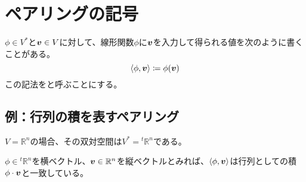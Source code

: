 \documentclass[../../../topic_linear-algebra]{subfiles}
\begin{document}
\sectionline
\section{ペアリングの記号}

$\phi \in V^*$と$\vb*{v} \in V$に対して、線形関数$\phi$に$\vb*{v}$を入力して得られる値を次のように書くことがある。
\begin{equation*}
  \langle \phi, \vb*{v} \rangle \coloneq \phi(\vb*{v})
\end{equation*}
この記法をと呼ぶことにする。

\subsection{例：行列の積を表すペアリング}

$V = \mathbb{R}^n$の場合、その双対空間は$V^* = {}^t\mathbb{R}^n$である。

\br

$\phi \in {}^t\mathbb{R}^n$を横ベクトル、$\vb*{v} \in \mathbb{R}^n$を縦ベクトルとみれば、$\langle \phi, \vb*{v} \rangle$は行列としての積$\phi \cdot \vb*{v}$と一致している。
\end{document}

